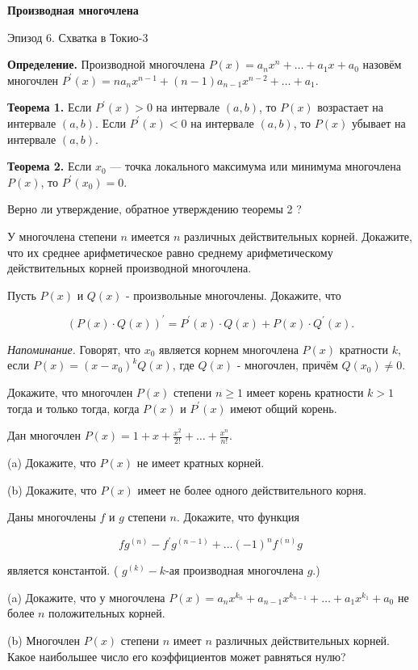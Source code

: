 \centerline{\bf \Huge Производная многочлена}

\begin{flushright}
        \scriptsize{Эпизод 6. Схватка в Токио-3}
\end{flushright}

\textbf{Определение.}
Производной многочлена $P(x)=a_n x^n+\ldots+a_1 x+a_0$ назовём многочлен $P^{\prime}(x)=n a_n x^{n-1}+(n-1) a_{n-1} x^{n-2}+\ldots+a_1$.

\textbf{Теорема 1.}
Если $P^{\prime}(x)>0$ на интервале $(a, b)$, то $P(x)$ возрастает на интервале $(a, b)$. Если $P^{\prime}(x)<0$ на интервале $(a, b)$, то $P(x)$ убывает на интервале $(a, b)$.

\textbf{Теорема 2.}
Если $x_0$ --- точка локального максимума или минимума многочлена $P(x)$, то $P^{\prime}\left(x_0\right)=0$.

Верно ли утверждение, обратное утверждению теоремы 2 ?

У многочлена степени $n$ имеется $n$ различных действительных корней. Докажите, что их среднее арифметическое равно среднему арифметическому действительных корней производной многочлена.


Пусть $P(x)$ и $Q(x)$ - произвольные многочлены. Докажите, что

$$
(P(x) \cdot Q(x))^{\prime}=P^{\prime}(x) \cdot Q(x)+P(x) \cdot Q^{\prime}(x) .
$$


\textit{Напоминание.} Говорят, что $x_0$ является корнем многочлена $P(x)$ кратности $k$, если $P(x)=\left(x-x_0\right)^k Q(x)$, где $Q(x)$ - многочлен, причём $Q\left(x_0\right) \neq 0$.

Докажите, что многочлен $P(x)$ степени $n \geqslant 1$ имеет корень кратности $k>1$ тогда и только тогда, когда $P(x)$ и $P^{\prime}(x)$ имеют общий корень.

Дан многочлен $P(x)=1+x+\frac{x^2}{2!}+\ldots+\frac{x^n}{n!}$.

(a) Докажите, что $P(x)$ не имеет кратных корней.

(b) Докажите, что $P(x)$ имеет не более одного действительного корня.

Даны многочлены $f$ и $g$ степени $n$. Докажите, что функция

$$
f g^{(n)}-f^{\prime} g^{(n-1)}+\ldots(-1)^n f^{(n)} g
$$


является константой. ( $g^{(k)}-k$-ая производная многочлена $g$.)

\newpage

\hspace{3mm}

(a) Докажите, что у многочлена $P(x)=a_n x^{k_n}+a_{n-1} x^{k_{n-1}}+\ldots+a_1 x^{k_1}+a_0$ не более $n$ положительных корней.

\noindent
(b) Многочлен $P(x)$ степени $n$ имеет $n$ различных действительных корней. Какое наибольшее число его коэффициентов может равняться нулю?